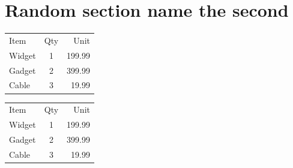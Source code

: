 \documentclass{article}
\begin{document}
\section{Random section name the second}
\begin{tabular}{lcr}

Item   & Qty & Unit \\
Widget & 1   & 199.99 \\
Gadget & 2   & 399.99 \\
Cable  & 3   & 19.99 \\

\end{tabular}


\begin{table}
\centering
\begin{tabular}{lcr}

Item   & Qty & Unit \\
Widget & 1   & 199.99 \\
Gadget & 2   & 399.99 \\
Cable  & 3   & 19.99 \\

\end{tabular}
\end{table}
\end{document}
